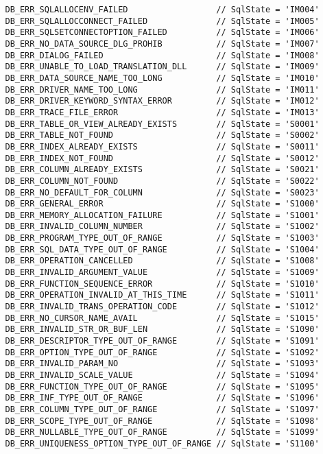 \begin{verbatim}
   DB_ERR_SQLALLOCENV_FAILED                  // SqlState = 'IM004'
   DB_ERR_SQLALLOCCONNECT_FAILED              // SqlState = 'IM005'
   DB_ERR_SQLSETCONNECTOPTION_FAILED          // SqlState = 'IM006'
   DB_ERR_NO_DATA_SOURCE_DLG_PROHIB           // SqlState = 'IM007'
   DB_ERR_DIALOG_FAILED                       // SqlState = 'IM008'
   DB_ERR_UNABLE_TO_LOAD_TRANSLATION_DLL      // SqlState = 'IM009'
   DB_ERR_DATA_SOURCE_NAME_TOO_LONG           // SqlState = 'IM010'
   DB_ERR_DRIVER_NAME_TOO_LONG                // SqlState = 'IM011'
   DB_ERR_DRIVER_KEYWORD_SYNTAX_ERROR         // SqlState = 'IM012'
   DB_ERR_TRACE_FILE_ERROR                    // SqlState = 'IM013'
   DB_ERR_TABLE_OR_VIEW_ALREADY_EXISTS        // SqlState = 'S0001'
   DB_ERR_TABLE_NOT_FOUND                     // SqlState = 'S0002'
   DB_ERR_INDEX_ALREADY_EXISTS                // SqlState = 'S0011'
   DB_ERR_INDEX_NOT_FOUND                     // SqlState = 'S0012'
   DB_ERR_COLUMN_ALREADY_EXISTS               // SqlState = 'S0021'
   DB_ERR_COLUMN_NOT_FOUND                    // SqlState = 'S0022'
   DB_ERR_NO_DEFAULT_FOR_COLUMN               // SqlState = 'S0023'
   DB_ERR_GENERAL_ERROR                       // SqlState = 'S1000'
   DB_ERR_MEMORY_ALLOCATION_FAILURE           // SqlState = 'S1001'
   DB_ERR_INVALID_COLUMN_NUMBER               // SqlState = 'S1002'
   DB_ERR_PROGRAM_TYPE_OUT_OF_RANGE           // SqlState = 'S1003'
   DB_ERR_SQL_DATA_TYPE_OUT_OF_RANGE          // SqlState = 'S1004'
   DB_ERR_OPERATION_CANCELLED                 // SqlState = 'S1008'
   DB_ERR_INVALID_ARGUMENT_VALUE              // SqlState = 'S1009'
   DB_ERR_FUNCTION_SEQUENCE_ERROR             // SqlState = 'S1010'
   DB_ERR_OPERATION_INVALID_AT_THIS_TIME      // SqlState = 'S1011'
   DB_ERR_INVALID_TRANS_OPERATION_CODE        // SqlState = 'S1012'
   DB_ERR_NO_CURSOR_NAME_AVAIL                // SqlState = 'S1015'
   DB_ERR_INVALID_STR_OR_BUF_LEN              // SqlState = 'S1090'
   DB_ERR_DESCRIPTOR_TYPE_OUT_OF_RANGE        // SqlState = 'S1091'
   DB_ERR_OPTION_TYPE_OUT_OF_RANGE            // SqlState = 'S1092'
   DB_ERR_INVALID_PARAM_NO                    // SqlState = 'S1093'
   DB_ERR_INVALID_SCALE_VALUE                 // SqlState = 'S1094'
   DB_ERR_FUNCTION_TYPE_OUT_OF_RANGE          // SqlState = 'S1095'
   DB_ERR_INF_TYPE_OUT_OF_RANGE               // SqlState = 'S1096'
   DB_ERR_COLUMN_TYPE_OUT_OF_RANGE            // SqlState = 'S1097'
   DB_ERR_SCOPE_TYPE_OUT_OF_RANGE             // SqlState = 'S1098'
   DB_ERR_NULLABLE_TYPE_OUT_OF_RANGE          // SqlState = 'S1099'
   DB_ERR_UNIQUENESS_OPTION_TYPE_OUT_OF_RANGE // SqlState = 'S1100'

\end{verbatim}
